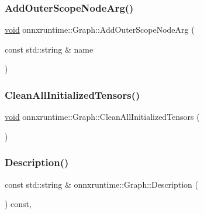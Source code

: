\subsubsection{\texorpdfstring{Add\+Outer\+Scope\+Node\+Arg()}{AddOuterScopeNodeArg()}}
{\footnotesize\ttfamily \mbox{\hyperlink{mlasi_8h_a88f941d423cb2a819b70a1358982b1a6}{void}} onnxruntime\+::\+Graph\+::\+Add\+Outer\+Scope\+Node\+Arg (\begin{DoxyParamCaption}\item[{const std\+::string \&}]{name }\end{DoxyParamCaption})\hspace{0.3cm}{\ttfamily [inline]}}

\mbox{\label{classonnxruntime_1_1Graph_adf174d71ce23ccbf32f80b18ee1fa244}} 
\subsubsection{\texorpdfstring{Clean\+All\+Initialized\+Tensors()}{CleanAllInitializedTensors()}}
{\footnotesize\ttfamily \mbox{\hyperlink{mlasi_8h_a88f941d423cb2a819b70a1358982b1a6}{void}} onnxruntime\+::\+Graph\+::\+Clean\+All\+Initialized\+Tensors (\begin{DoxyParamCaption}{ }\end{DoxyParamCaption})\hspace{0.3cm}{\ttfamily [noexcept]}}

\mbox{\label{classonnxruntime_1_1Graph_a3cde3be78cc7acab2626b189af64f82f}} 
\subsubsection{\texorpdfstring{Description()}{Description()}}
{\footnotesize\ttfamily const std\+::string \& onnxruntime\+::\+Graph\+::\+Description (\begin{DoxyParamCaption}{ }\end{DoxyParamCaption}) const\hspace{0.3cm}{\ttfamily [virtual]}, {\ttfamily [noexcept]}}

